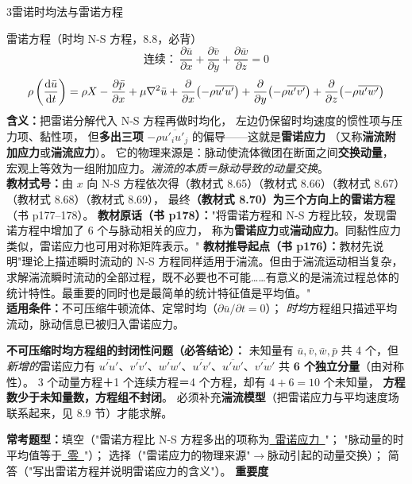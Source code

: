 \begin{kaodian}{3}{雷诺时均法与雷诺方程}
\begin{gongshi}{雷诺方程（时均 N-S 方程，8.8，必背）}
\[ \text{连续：}\ \frac{\partial \bar u}{\partial x}+\frac{\partial \bar v}{\partial y}+\frac{\partial \bar w}{\partial z}=0 \]
\[ \rho\left(\frac{\mathrm{d} \bar u}{\mathrm{d} t}\right)
   =\rho X-\frac{\partial \bar p}{\partial x}
   +\mu\nabla^2\bar u
   +\frac{\partial}{\partial x}\!\left(-\rho\overline{u'u'}\right)
   +\frac{\partial}{\partial y}\!\left(-\rho\overline{u'v'}\right)
   +\frac{\partial}{\partial z}\!\left(-\rho\overline{u'w'}\right) \]
\textbf{含义：}把雷诺分解代入 N-S 方程再做时均化，
左边仍保留时均速度的惯性项与压力项、黏性项，
但\textbf{多出三项} $-\rho\overline{u'_iu'_j}$ 的偏导——这就是\textbf{雷诺应力}
（又称\textbf{湍流附加应力}或\textbf{湍流应力}）。
它的物理来源是：脉动使流体微团在断面之间\textbf{交换动量}，
宏观上等效为一组附加应力。\emph{湍流的本质＝脉动导致的动量交换}。\\
\textbf{教材式号：}由 $x$ 向 N-S 方程依次得（教材式 8.65）（教材式 8.66）（教材式 8.67）（教材式 8.68）（教材式 8.69），
最终\textbf{（教材式 8.70）为三个方向上的雷诺方程}（书 p177--178）。
\textbf{教材原话（书 p178）：}"将雷诺方程和 N-S 方程比较，发现雷诺方程中增加了 6 个与脉动相关的应力，
称为\textbf{雷诺应力}或\textbf{湍动应力}。同黏性应力类似，雷诺应力也可用对称矩阵表示。"
\textbf{教材推导起点（书 p176）：}教材先说明"理论上描述瞬时流动的 N-S 方程同样适用于湍流。但由于湍流运动相当复杂，
求解湍流瞬时流动的全部过程，既不必要也不可能……有意义的是湍流过程总体的统计特性。最重要的同时也是最简单的统计特征值是平均值。"\\
\textbf{适用条件：}不可压缩牛顿流体、定常时均（$\partial\bar u/\partial t=0$）；
\emph{时均}方程组只描述平均流动，脉动信息已被归入雷诺应力。
\end{gongshi}

\textbf{不可压缩时均方程组的封闭性问题（必答结论）：}
未知量有 $\bar u,\bar v,\bar w,\bar p$ 共 4 个，但\emph{新增的}雷诺应力有
$\overline{u'u'}$、$\overline{v'v'}$、$\overline{w'w'}$、$\overline{u'v'}$、$\overline{u'w'}$、$\overline{v'w'}$
共 \textbf{6 个独立分量}（由对称性）。
3 个动量方程＋1 个连续方程＝4 个方程，却有 $4+6=10$ 个未知量，
\textbf{方程数少于未知量数，方程组不封闭}。
必须补充\textbf{湍流模型}（把雷诺应力与平均速度场联系起来，见 8.9 节）才能求解。

\textbf{常考题型：}填空（"雷诺方程比 N-S 方程多出的项称为\underline{\ 雷诺应力\ }"；
"脉动量的时平均值等于\underline{\ 零\ }"）；
选择（"雷诺应力的物理来源"$\to$脉动引起的动量交换）；
简答（"写出雷诺方程并说明雷诺应力的含义"）。
\textbf{重要度 }\quad{}\quad{}


\end{kaodian}
